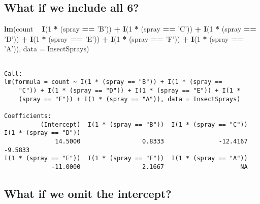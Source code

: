 \documentclass[12pt,openright,oneside,a4paper,chapter=TITLE,section=TITLE,subsection=Title,english,french,spanish,portugues,sumario=tradicional]{04-class-files/abntex2}
\newenvironment{Shaded}{\begin{snugshade}}{\end{snugshade}}
\newcommand{\DataTypeTok}[1]{\textcolor[rgb]{0.13,0.29,0.53}{#1}}
\newcommand{\DecValTok}[1]{\textcolor[rgb]{0.00,0.00,0.81}{#1}}
\newcommand{\KeywordTok}[1]{\textcolor[rgb]{0.13,0.29,0.53}{\textbf{#1}}}
\newcommand{\NormalTok}[1]{#1}
\newcommand{\OperatorTok}[1]{\textcolor[rgb]{0.81,0.36,0.00}{\textbf{#1}}}
\newcommand{\StringTok}[1]{\textcolor[rgb]{0.31,0.60,0.02}{#1}}
\begin{document}
\hypertarget{what-if-we-include-all-6}{%
\subsection{What if we include all 6?}\label{what-if-we-include-all-6}}

\begin{Shaded}
\begin{Highlighting}[]
\KeywordTok{lm}\NormalTok{(count }\OperatorTok{~}\StringTok{ }
\StringTok{   }\KeywordTok{I}\NormalTok{(}\DecValTok{1} \OperatorTok{*}\StringTok{ }\NormalTok{(spray }\OperatorTok{==}\StringTok{ 'B'}\NormalTok{)) }\OperatorTok{+}\StringTok{ }\KeywordTok{I}\NormalTok{(}\DecValTok{1} \OperatorTok{*}\StringTok{ }\NormalTok{(spray }\OperatorTok{==}\StringTok{ 'C'}\NormalTok{)) }\OperatorTok{+}\StringTok{  }
\StringTok{   }\KeywordTok{I}\NormalTok{(}\DecValTok{1} \OperatorTok{*}\StringTok{ }\NormalTok{(spray }\OperatorTok{==}\StringTok{ 'D'}\NormalTok{)) }\OperatorTok{+}\StringTok{ }\KeywordTok{I}\NormalTok{(}\DecValTok{1} \OperatorTok{*}\StringTok{ }\NormalTok{(spray }\OperatorTok{==}\StringTok{ 'E'}\NormalTok{)) }\OperatorTok{+}
\StringTok{   }\KeywordTok{I}\NormalTok{(}\DecValTok{1} \OperatorTok{*}\StringTok{ }\NormalTok{(spray }\OperatorTok{==}\StringTok{ 'F'}\NormalTok{)) }\OperatorTok{+}\StringTok{ }\KeywordTok{I}\NormalTok{(}\DecValTok{1} \OperatorTok{*}\StringTok{ }\NormalTok{(spray }\OperatorTok{==}\StringTok{ 'A'}\NormalTok{)), }\DataTypeTok{data =}\NormalTok{ InsectSprays)}
\end{Highlighting}
\end{Shaded}

\begin{verbatim}

Call:
lm(formula = count ~ I(1 * (spray == "B")) + I(1 * (spray == 
    "C")) + I(1 * (spray == "D")) + I(1 * (spray == "E")) + I(1 * 
    (spray == "F")) + I(1 * (spray == "A")), data = InsectSprays)

Coefficients:
          (Intercept)  I(1 * (spray == "B"))  I(1 * (spray == "C"))  I(1 * (spray == "D"))  
              14.5000                 0.8333               -12.4167                -9.5833  
I(1 * (spray == "E"))  I(1 * (spray == "F"))  I(1 * (spray == "A"))  
             -11.0000                 2.1667                     NA  
\end{verbatim}

\hypertarget{what-if-we-omit-the-intercept}{%
\subsection{What if we omit the intercept?}\label{what-if-we-omit-the-intercept}}
\end{document}
